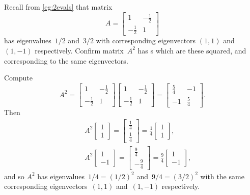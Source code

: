 \begin{example} \label{eg:2x2sympow}
Recall from \autoref{eg:2evals} that matrix 
\begin{equation*}
A=\begin{bmatrix} 1&-\frac12\\-\frac12&1 \end{bmatrix}
\end{equation*}
has eigenvalues~\(1/2\) and~\(3/2\) with corresponding eigenvectors \((1,1)\) and~\((1,-1)\) respectively.
Confirm matrix~\(A^2\) has s which are these squared, and corresponding to the same eigenvectors.
\begin{solution} 
Compute
\begin{equation*}
A^2=\begin{bmatrix} 1&-\frac12\\-\frac12&1 \end{bmatrix}
\begin{bmatrix} 1&-\frac12\\-\frac12&1 \end{bmatrix}
=\begin{bmatrix} \frac54&-1\\-1&\frac54 \end{bmatrix}.
\end{equation*}
Then
\begin{eqnarray*}
&&A^2\begin{bmatrix} 1\\1 \end{bmatrix}
=\begin{bmatrix} \frac14\\ \frac14 \end{bmatrix}
=\frac14\begin{bmatrix} 1\\1 \end{bmatrix},
\\&&A^2\begin{bmatrix} 1\\-1 \end{bmatrix}
=\begin{bmatrix} \frac94\\-\frac94 \end{bmatrix}
=\frac94\begin{bmatrix} 1\\-1 \end{bmatrix},
\end{eqnarray*}
and so \(A^2\) has eigenvalues~\(1/4=(1/2)^2\) and~\(9/4=(3/2)^2\) with the same corresponding eigenvectors~\((1,1)\) and~\((1,-1)\) respectively.
\end{solution}
\end{example}



